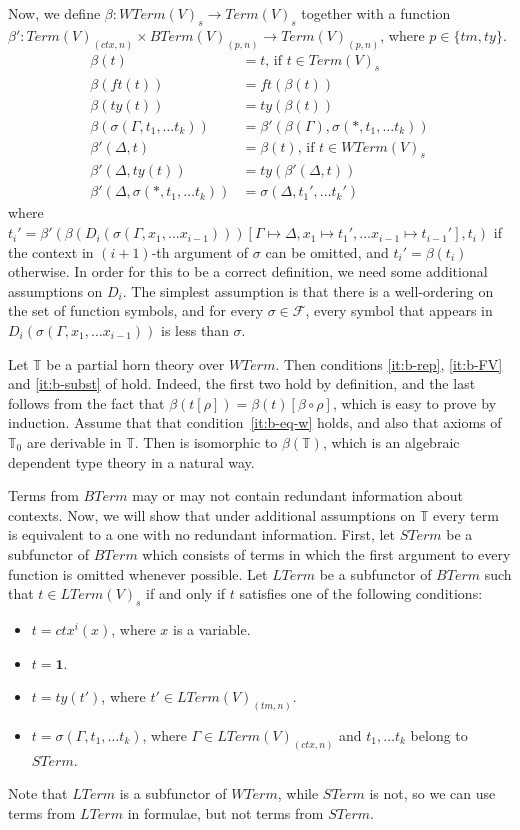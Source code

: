 \documentclass{elsarticle}
\theoremstyle{definition}
\theoremstyle{remark}
\newcommand{\emptyCtx}{\mathbf{1}}
\numberwithin{figure}{section}
\begin{document}
Now, we define $\beta : WTerm(V)_s \to Term(V)_s$ together with a function $\beta' : Term(V)_{(ctx,n)} \times BTerm(V)_{(p,n)} \to Term(V)_{(p,n)}$, where $p \in \{ tm,ty \}$.
\begin{align*}
\beta(t) & = t \text{, if } t \in Term(V)_s \\
\beta(ft(t)) & = ft(\beta(t)) \\
\beta(ty(t)) & = ty(\beta(t)) \\
\beta(\sigma(\Gamma, t_1, \ldots t_k)) & = \beta'(\beta(\Gamma), \sigma(*, t_1, \ldots t_k)) \\
\beta'(\Delta, t) & = \beta(t) \text{, if } t \in WTerm(V)_s \\
\beta'(\Delta, ty(t)) & = ty(\beta'(\Delta, t)) \\
\beta'(\Delta, \sigma(*, t_1, \ldots t_k)) & = \sigma(\Delta, t_1', \ldots t_k')
\end{align*}
where $t_i' = \beta'(\beta(D_i(\sigma(\Gamma, x_1, \ldots x_{i-1})))[\Gamma \mapsto \Delta, x_1 \mapsto t_1', \ldots x_{i-1} \mapsto t_{i-1}'], t_i)$
    if the context in $(i+1)$-th argument of $\sigma$ can be omitted, and $t_i' = \beta(t_i)$ otherwise.
In order for this to be a correct definition, we need some additional assumptions on $D_i$.
The simplest assumption is that there is a well-ordering on the set of function symbols, and for every $\sigma \in \mathcal{F}$,
    every symbol that appears in $D_i(\sigma(\Gamma, x_1, \ldots x_{i-1}))$ is less than $\sigma$.

Let $\mathbb{T}$ be a partial horn theory over $WTerm$.
Then conditions \eqref{it:b-rep}, \eqref{it:b-FV} and \eqref{it:b-subst} of  hold.
Indeed, the first two hold by definition, and the last follows from the fact that $\beta(t[\rho]) = \beta(t)[\beta \circ \rho]$, which is easy to prove by induction.
Assume that that condition~\eqref{it:b-eq-w} holds, and also that axioms of $\mathbb{T}_0$ are derivable in $\mathbb{T}$.
Then is isomorphic to $\beta(\mathbb{T})$, which is an algebraic dependent type theory in a natural way.

Terms from $BTerm$ may or may not contain redundant information about contexts.
Now, we will show that under additional assumptions on $\mathbb{T}$ every term is equivalent to a one with no redundant information.
First, let $STerm$ be a subfunctor of $BTerm$ which consists of terms in which the first argument to every function is omitted whenever possible.
Let $LTerm$ be a subfunctor of $BTerm$ such that $t \in LTerm(V)_s$ if and only if $t$ satisfies one of the following conditions:
\begin{itemize}
\item $t = ctx^i(x)$, where $x$ is a variable.
\item $t = \emptyCtx$.
\item $t = ty(t')$, where $t' \in LTerm(V)_{(tm,n)}$.
\item $t = \sigma(\Gamma, t_1, \ldots t_k)$, where $\Gamma \in LTerm(V)_{(ctx,n)}$ and $t_1, \ldots t_k$ belong to $STerm$.
\end{itemize}
Note that $LTerm$ is a subfunctor of $WTerm$, while $STerm$ is not, so we can use terms from $LTerm$ in formulae, but not terms from $STerm$.
\end{document}
